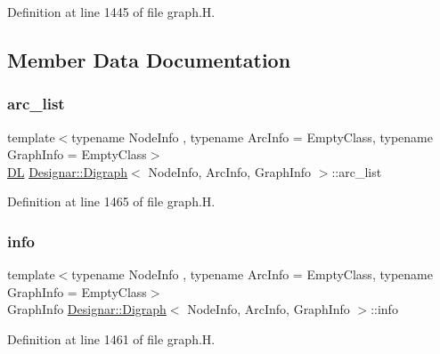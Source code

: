 Definition at line 1445 of file graph.\+H.



\subsection{Member Data Documentation}
\mbox{\label{class_designar_1_1_digraph_ad860dbe9732bc90906a486cad390637a}} 
\subsubsection{\texorpdfstring{arc\+\_\+list}{arc\_list}}
{\footnotesize\ttfamily template$<$typename Node\+Info , typename Arc\+Info  = Empty\+Class, typename Graph\+Info  = Empty\+Class$>$ \\
\hyperlink{class_designar_1_1_d_l}{DL} \hyperlink{class_designar_1_1_digraph}{Designar\+::\+Digraph}$<$ Node\+Info, Arc\+Info, Graph\+Info $>$\+::arc\+\_\+list\hspace{0.3cm}{\ttfamily [protected]}}



Definition at line 1465 of file graph.\+H.

\mbox{\label{class_designar_1_1_digraph_aec655bb1b26775cb7ad3581240290efe}} 
\subsubsection{\texorpdfstring{info}{info}}
{\footnotesize\ttfamily template$<$typename Node\+Info , typename Arc\+Info  = Empty\+Class, typename Graph\+Info  = Empty\+Class$>$ \\
Graph\+Info \hyperlink{class_designar_1_1_digraph}{Designar\+::\+Digraph}$<$ Node\+Info, Arc\+Info, Graph\+Info $>$\+::info\hspace{0.3cm}{\ttfamily [protected]}}



Definition at line 1461 of file graph.\+H.

\mbox{\label{class_designar_1_1_digraph_ac81c264dab34ca74fc62b0693c1c3543}} 
